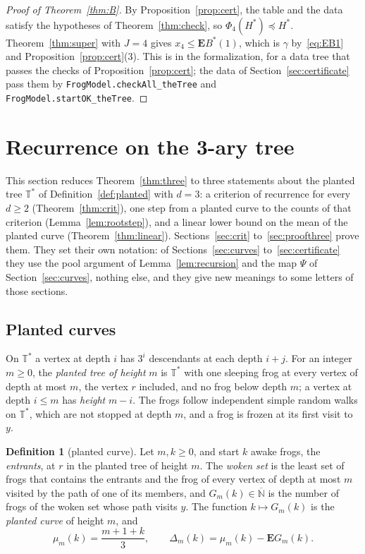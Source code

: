 \documentclass[11pt]{amsart}
\theoremstyle{definition}
\newtheorem{definition}[theorem]{Definition}
\numberwithin{equation}{section}
\newcommand{\lean}[1]{\ignorespaces}
\newcommand{\Ts}{\mathbb{T}^{*}}
\newcommand{\Nb}{\overline{\mathbb{N}}}
\newcommand{\E}{\mathbf{E}}
\newcommand{\cst}{\gamma}
\newcommand{\stle}{\preceq}
\begin{document}
\begin{proof}[Proof of Theorem~\ref{thm:B}]
By Proposition~\ref{prop:cert}, the table and the data satisfy the hypotheses of Theorem~\ref{thm:check}, so $\Phi_4(H^*)\stle H^*$. Theorem~\ref{thm:super} with $J=4$ gives $x_4\le\E B^*(1)$, which is $\cst$ by~\eqref{eq:EB1} and Proposition~\ref{prop:cert}(3). This is  in the formalization, for a data tree that passes the checks of Proposition~\ref{prop:cert}; the data of Section~\ref{sec:certificate} pass them by \texttt{FrogModel.checkAll\_theTree} and \texttt{FrogModel.startOK\_theTree}.
\end{proof}

\section{Recurrence on the 3-ary tree}\label{sec:three}

This section reduces Theorem~\ref{thm:three} to three statements about the planted tree $\Ts$ of Definition~\ref{def:planted} with $d=3$: a criterion of recurrence for every $d\ge2$ (Theorem~\ref{thm:crit}), one step from a planted curve to the counts of that criterion (Lemma~\ref{lem:rootstep}), and a linear lower bound on the mean of the planted curve (Theorem~\ref{thm:linear}). Sections~\ref{sec:crit} to~\ref{sec:proofthree} prove them. They set their own notation: of Sections~\ref{sec:curves} to~\ref{sec:certificate} they use the pool argument of Lemma~\ref{lem:recursion} and the map $\Psi$ of Section~\ref{sec:curves}, nothing else, and they give new meanings to some letters of those sections.

\subsection*{Planted curves}
On $\Ts$ a vertex at depth $i$ has $3^i$ descendants at each depth $i+j$. For an integer $m\ge0$, the \emph{planted tree of height} $m$ is $\Ts$ with one sleeping frog at every vertex of depth at most $m$, the vertex $r$ included, and no frog below depth $m$; a vertex at depth $i\le m$ has \emph{height} $m-i$. The frogs follow independent simple random walks on $\Ts$, which are not stopped at depth $m$, and a frog is frozen at its first visit to $y$.

\begin{definition}[planted curve]\label{def:plantedcurve}\lean{FrogModel.D3.Iface.plantedG, FrogModel.D3.Iface.Woken, FrogModel.D3.Iface.pathMeasure, FrogModel.D3.Iface.mu, FrogModel.D3.Iface.deficit}
Let $m,k\ge0$, and start $k$ awake frogs, the \emph{entrants}, at $r$ in the planted tree of height $m$. The \emph{woken set} is the least set of frogs that contains the entrants and the frog of every vertex of depth at most $m$ visited by the path of one of its members, and $G_m(k)\in\Nb$ is the number of frogs of the woken set whose path visits $y$. The function $k\mapsto G_m(k)$ is the \emph{planted curve} of height $m$, and
\[
\mu_m(k)=\frac{m+1+k}3,\qquad\Delta_m(k)=\mu_m(k)-\E G_m(k).
\]
\end{definition}
\end{document}
